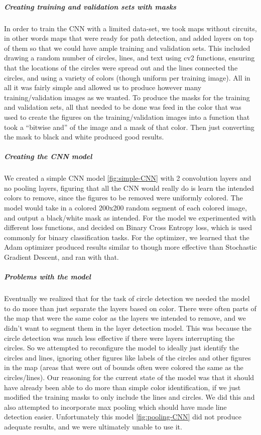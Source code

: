 \documentclass[a4paper,12pt]{extarticle}
\begin{document}
\subparagraph{Creating training and validation sets with masks\\}

In order to train the CNN with a limited data-set, we took maps without circuits, in other words maps that were ready for path detection, and added layers on top of them so that we could have ample training and validation sets. This included drawing a random number of circles, lines, and text using cv2 functions, ensuring that the locations of the circles were spread out and the lines connected the circles, and using a variety of colors (though uniform per training image). All in all it was fairly simple and allowed us to produce however many training/validation images as we wanted. To produce the masks for the training and validation sets, all that needed to be done was feed in the color that was used to create the figures on the training/validation images into a function that took a “bitwise and” of the image and a mask of that color. Then just converting the mask to black and white produced good results.

\subparagraph{Creating the CNN model\\}
We created a simple CNN model \ref{fig:simple-CNN} with 2 convolution layers and no pooling layers, figuring that all the CNN would really do is learn the intended colors to remove, since the figures to be removed were uniformly colored. The model would take in a colored 200x200 random segment of each colored image, and output a black/white mask as intended. For the model we experimented with different loss functions, and decided on Binary Cross Entropy loss, which is used commonly for binary classification tasks. For the optimizer, we learned that the Adam optimizer produced results similar to though more effective than Stochastic Gradient Descent, and ran with that.



\subparagraph{Problems with the model\\}
Eventually we realized that for the task of circle detection we needed the model to do more than just separate the layers based on color.
There were often parts of the map that were the same color as the layers we intended to remove, and we didn't want to segment them in the layer detection model.
This was because the circle detection was much less effective if there were layers interrupting the circles. So we attempted to reconfigure the model to ideally just identify the circles and lines, ignoring other figures like labels of the circles and other figures in the map (areas that were out of bounds often were colored the same as the circles/lines).
Our reasoning for the current state of the model was that it should have already been able to do more than simple color identification, if we just modified the training masks to only include the lines and circles. We did this and also attempted to incorporate max pooling which should have made line detection easier. Unfortunately this model \ref{fig:pooling-CNN} did not produce adequate results, and we were ultimately unable to use it.
\end{document}

